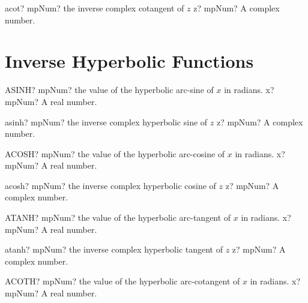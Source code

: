 \documentclass[12pt,a4paper,openany]{book}
\begin{document}
\begin{mpFunctionsExtract}
\mpFunctionOne
{acot? mpNum? the inverse complex cotangent of $z$}
{z? mpNum? A complex number.}
\end{mpFunctionsExtract}

\section{Inverse Hyperbolic Functions}

\begin{mpFunctionsExtract}
\mpWorksheetFunctionOneNotImplemented
{ASINH? mpNum? the value of the hyperbolic arc-sine  of $x$ in radians.}
{x? mpNum? A real number.}
\end{mpFunctionsExtract}

\begin{mpFunctionsExtract}
\mpFunctionOne
{asinh? mpNum? the inverse complex hyperbolic sine of $z$}
{z? mpNum? A complex number.}
\end{mpFunctionsExtract}

\begin{mpFunctionsExtract}
\mpWorksheetFunctionOneNotImplemented
{ACOSH? mpNum? the value of the hyperbolic arc-cosine  of $x$ in radians.}
{x? mpNum? A real number.}
\end{mpFunctionsExtract}

\begin{mpFunctionsExtract}
\mpFunctionOne
{acosh? mpNum? the inverse complex hyperbolic cosine of $z$}
{z? mpNum? A complex number.}
\end{mpFunctionsExtract}

\begin{mpFunctionsExtract}
\mpWorksheetFunctionOneNotImplemented
{ATANH? mpNum? the value of the hyperbolic arc-tangent  of $x$ in radians.}
{x? mpNum? A real number.}
\end{mpFunctionsExtract}

\begin{mpFunctionsExtract}
\mpFunctionOne
{atanh? mpNum? the inverse complex hyperbolic tangent of $z$}
{z? mpNum? A complex number.}
\end{mpFunctionsExtract}

\begin{mpFunctionsExtract}
\mpWorksheetFunctionOneNotImplemented
{ACOTH? mpNum? the value of the hyperbolic arc-cotangent  of $x$ in radians.}
{x? mpNum? A real number.}
\end{mpFunctionsExtract}
\end{document}
